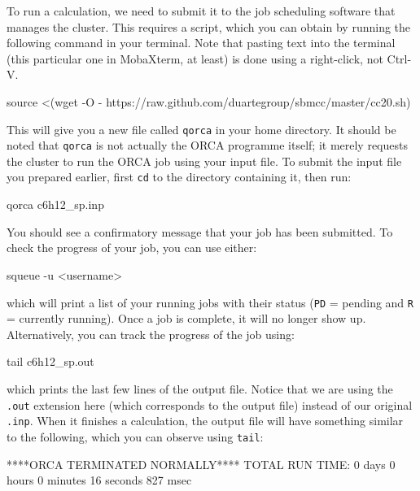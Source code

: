 \documentclass[10pt]{article}
\begin{document}
To run a calculation, we need to submit it to the job scheduling software that manages the cluster. This requires a script, which you can obtain by running the following command in your terminal. Note that pasting text into the terminal (this particular one in MobaXterm, at least) is done using a right-click, not Ctrl-V. 

\begin{cmdline}
source <(wget -O - https://raw.github.com/duartegroup/sbmcc/master/cc20.sh)
\end{cmdline}

This will give you a new file called \texttt{qorca} in your home directory. It should be noted that \texttt{qorca} is not actually the ORCA programme itself; it merely requests the cluster to run the ORCA job using your input file.  To submit the input file you prepared earlier, first \texttt{cd} to the directory containing it, then run:

\begin{cmdline}
qorca c6h12_sp.inp
\end{cmdline}

You should see a confirmatory message that your job has been submitted. To check the progress of your job, you can use either:

\begin{cmdline}
squeue -u <username>
\end{cmdline}

which will print a list of your running jobs with their status (\texttt{PD} = pending and \texttt{R} = currently running). Once a job is complete, it will no longer show up. Alternatively, you can track the progress of the job using:

\begin{cmdline}
tail c6h12_sp.out
\end{cmdline}

which prints the last few lines of the output file. Notice that we are using the \texttt{.out} extension here (which corresponds to the output file) instead of our original \texttt{.inp}. When it finishes a calculation, the output file will have something similar to the following, which you can observe using \texttt{tail}:

\begin{cmdline}
              ****ORCA TERMINATED NORMALLY****
TOTAL RUN TIME: 0 days 0 hours 0 minutes 16 seconds 827 msec
\end{cmdline}
\end{document}
